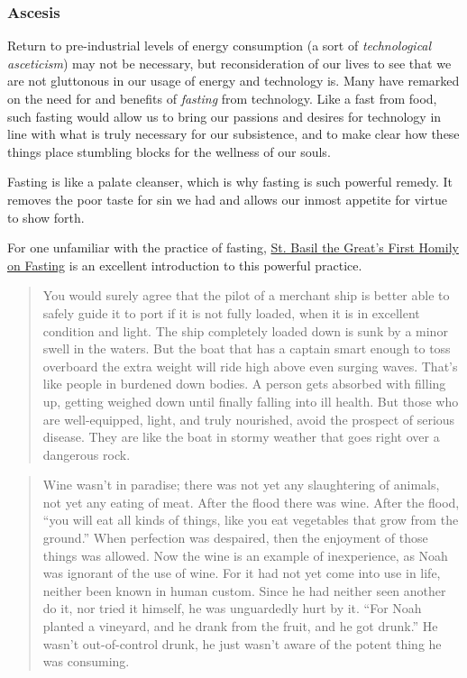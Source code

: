\documentclass[letterpaper]{article}
\begin{document}
\subsubsection{Ascesis}

Return to pre-industrial levels of energy consumption (a sort of \textit{technological asceticism}) may not be necessary, but reconsideration of our lives to see that we are not gluttonous in our usage of energy and technology is. Many have remarked on the need for and benefits of \textit{fasting} from technology. Like a fast from food, such fasting would allow us to bring our passions and desires for technology in line with what is truly necessary for our subsistence, and to make clear how these things place stumbling blocks for the wellness of our souls. 

Fasting is like a palate cleanser, which is why fasting is such powerful remedy. It removes the poor taste for sin we had and allows our inmost appetite for virtue to show forth.

For one unfamiliar with the practice of fasting, \href{http://rutgersnb.occministries.org/wp-content/uploads/2015/07/St.-Basil-the-Great%E2%80%99s-First-Homily-on-Fasting.pdf}{St. Basil the Great's First Homily on Fasting} is an excellent introduction to this powerful practice. 

\begin{quote}
  You would surely agree that the pilot of a merchant ship is better able to safely guide it to port if it is not fully loaded, when it is in excellent condition and light. The ship completely loaded down is sunk by a minor swell in the waters. But the boat that has a captain smart enough to toss overboard the extra weight will ride high above even surging waves.
  That’s like people in burdened down bodies. A person gets absorbed with filling up, getting weighed down until finally falling into ill health. But those who are well-equipped, light, and truly nourished, avoid the prospect of serious disease. They are like the boat in stormy weather that goes right over a dangerous rock.
\end{quote}

\iffalse
\begin{quote}
  Wine wasn’t in paradise; there was not yet any slaughtering of animals, not yet any eating of meat. After the flood there was wine. After the flood, “you will eat all kinds of things, like you eat vegetables that grow from the ground.” When perfection was despaired, then the enjoyment of those things was allowed.
  Now the wine is an example of inexperience, as Noah was ignorant of the use of wine. For it had not yet come into use in life, neither been known in human custom. Since he had neither seen another do it, nor tried it himself, he was unguardedly hurt by it. “For Noah planted a vineyard, and he drank from the fruit, and he got drunk.” He wasn’t out-of-control drunk, he just wasn’t aware of the potent thing he was consuming.
\end{quote}
\end{document}

